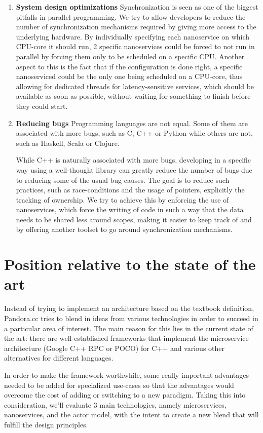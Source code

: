 \begin{enumerate}
\item \textbf{System design optimizations} Synchronization is seen as one of the biggest pitfalls in parallel programming. We try to allow developers to reduce the number of synchronization mechanisms required by giving more access to the underlying hardware. By individually specifying each nanoservice on which CPU-core it should run, 2 specific nanoservices could be forced to not run in parallel by forcing them only to be scheduled on a specific CPU. Another aspect to this is the fact that if the configuration is done right, a specific nanoserviced could be the only one being scheduled on a CPU-core, thus allowing for dedicated threads for latency-sensitive services, which should be available as soon as possible, without waiting for something to finish before they could start.

\item \textbf{Reducing bugs} Programming languages are not equal. Some of them are associated with more bugs, such as C, C++ or Python while others are not, such as Haskell, Scala or Clojure\cite{progimpact}.

 While C++ is naturally associated with more bugs, developing in a specific way using a well-thought library can greatly reduce the number of bugs due to reducing some of the usual bug causes. The goal is to reduce such practices, such as race-conditions and the usage of pointers, explicitly the tracking of ownership. We try to achieve this by enforcing the use of nanoservices, which force the writing of code in such a way that the data needs to be shared less around scopes, making it easier to keep track of and by offering another toolset to go around synchronization mechanisms.
\end{enumerate}

\section*{Position relative to the state of the art}
Instead of trying to implement an architecture based on the textbook definition, Pandora.cc tries to blend in ideas from various technologies in order to succeed in a particular area of interest. The main reason for this lies in the current state of the art: there are well-established frameworks that implement the microservice architecture (Google C++ RPC or POCO) for C++ and various other alternatives for different languages. 

In order to make the framework worthwhile, some really important advantages needed to be added for specialized use-cases so that the advantages would overcome the cost of adding or switching to a new paradigm. Taking this into consideration, we'll evaluate 3 main technologies, namely microservices, nanoservices, and the actor model, with the intent to create a new blend that will fulfill the design principles.


